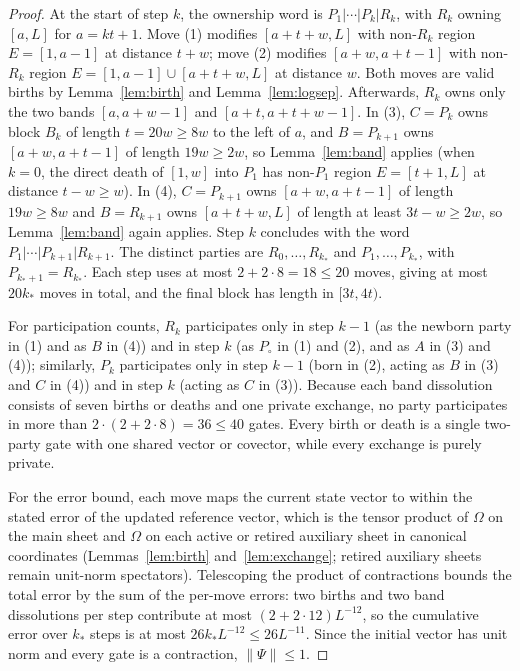 \documentclass[aps,prx,reprint,superscriptaddress,floatfix,nofootinbib,longbibliography,amsmath,amssymb]{revtex4-2}
\newcommand{\norm}[1]{\lVert #1\rVert}
\newcommand{\Om}{\Omega}
\theoremstyle{plain}
\theoremstyle{definition}
\begin{document}
\begin{proof}
At the start of step $k$, the ownership word is $P_1|\cdots|P_k|R_k$, with $R_k$ owning
$[a,L]$ for $a=kt+1$. Move (1) modifies $[a+t+w,L]$ with non-$R_k$ region
$E=[1,a-1]$ at distance $t+w$; move (2) modifies $[a+w,a+t-1]$ with non-$R_k$ region
$E=[1,a-1]\cup[a+t+w,L]$ at distance $w$. Both moves are valid births by
Lemma~\ref{lem:birth} and Lemma~\ref{lem:logsep}. Afterwards, $R_k$ owns
only the two bands $[a,a+w-1]$ and $[a+t,a+t+w-1]$. In (3), $C=P_k$ owns
block $B_k$ of length $t=20w\ge8w$ to the left of $a$, and $B=P_{k+1}$ owns
$[a+w,a+t-1]$ of length $19w\ge2w$, so Lemma~\ref{lem:band} applies
(when $k=0$, the direct death of $[1,w]$ into $P_1$ has non-$P_1$ region $E=[t+1,L]$ at distance
$t-w\ge w$). In (4), $C=P_{k+1}$ owns $[a+w,a+t-1]$ of length $19w\ge8w$ and
$B=R_{k+1}$ owns $[a+t+w,L]$ of length at least $3t-w\ge2w$, so Lemma~\ref{lem:band} again applies. Step $k$ concludes with
the word $P_1|\cdots|P_{k+1}|R_{k+1}$. The distinct parties are $R_0,\dots,R_{k_*}$
and $P_1,\dots,P_{k_*}$, with $P_{k_*+1}=R_{k_*}$. Each step uses at most $2+2\cdot8=18\le20$ moves, giving at most $20k_*$ moves in total, and the final
block has length in $[3t,4t)$.

For participation counts, $R_k$ participates only in step $k-1$ (as the newborn party in (1)
and as $B$ in (4)) and in step $k$ (as $P_\circ$ in (1) and (2), and as $A$ in (3) and
(4)); similarly, $P_k$ participates only in step $k-1$ (born in (2), acting as $B$ in (3) and $C$ in (4))
and in step $k$ (acting as $C$ in (3)). Because each band dissolution consists of seven births or deaths and one
private exchange, no party participates in more than $2\cdot(2+2\cdot8)=36\le40$ gates.
Every birth or death is a single two-party gate with one shared
vector or covector, while every exchange is purely private.

For the error bound, each move maps the current state vector to within the stated
error of the updated reference vector, which is the tensor product of $\Om$
on the main sheet and $\Om$ on each active or retired auxiliary sheet in canonical
coordinates (Lemmas~\ref{lem:birth} and~\ref{lem:exchange}; retired auxiliary sheets
remain unit-norm spectators). Telescoping the product of contractions bounds
the total error by the sum of the per-move errors: two births and
two band dissolutions per step contribute at most $(2+2\cdot12)L^{-12}$, so the cumulative error over $k_*$ steps
is at most $26k_*L^{-12}\le 26L^{-11}$. Since the initial vector has unit norm and every gate is a
contraction, $\norm\Psi\le1$.
\end{proof}
\end{document}
